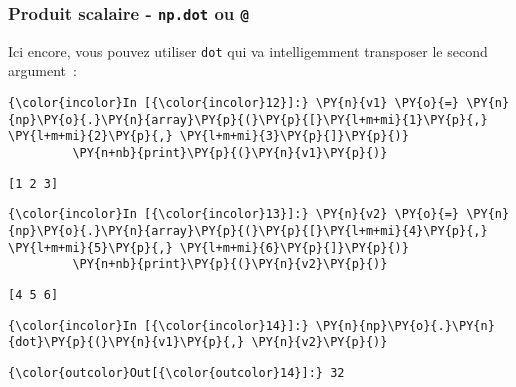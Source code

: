     \hypertarget{produit-scalaire---np.dot-ou}{%
\subsubsection{\texorpdfstring{Produit scalaire - \texttt{np.dot} ou
\texttt{@}}{Produit scalaire - np.dot ou @}}\label{produit-scalaire---np.dot-ou}}

    Ici encore, vous pouvez utiliser \texttt{dot} qui va intelligemment
transposer le second argument~:

    \begin{Verbatim}[commandchars=\\\{\}]
{\color{incolor}In [{\color{incolor}12}]:} \PY{n}{v1} \PY{o}{=} \PY{n}{np}\PY{o}{.}\PY{n}{array}\PY{p}{(}\PY{p}{[}\PY{l+m+mi}{1}\PY{p}{,} \PY{l+m+mi}{2}\PY{p}{,} \PY{l+m+mi}{3}\PY{p}{]}\PY{p}{)}
         \PY{n+nb}{print}\PY{p}{(}\PY{n}{v1}\PY{p}{)}
\end{Verbatim}


    \begin{Verbatim}[commandchars=\\\{\}]
[1 2 3]

    \end{Verbatim}

    \begin{Verbatim}[commandchars=\\\{\}]
{\color{incolor}In [{\color{incolor}13}]:} \PY{n}{v2} \PY{o}{=} \PY{n}{np}\PY{o}{.}\PY{n}{array}\PY{p}{(}\PY{p}{[}\PY{l+m+mi}{4}\PY{p}{,} \PY{l+m+mi}{5}\PY{p}{,} \PY{l+m+mi}{6}\PY{p}{]}\PY{p}{)}
         \PY{n+nb}{print}\PY{p}{(}\PY{n}{v2}\PY{p}{)}
\end{Verbatim}


    \begin{Verbatim}[commandchars=\\\{\}]
[4 5 6]

    \end{Verbatim}

    \begin{Verbatim}[commandchars=\\\{\}]
{\color{incolor}In [{\color{incolor}14}]:} \PY{n}{np}\PY{o}{.}\PY{n}{dot}\PY{p}{(}\PY{n}{v1}\PY{p}{,} \PY{n}{v2}\PY{p}{)}
\end{Verbatim}


\begin{Verbatim}[commandchars=\\\{\}]
{\color{outcolor}Out[{\color{outcolor}14}]:} 32
\end{Verbatim}
            

